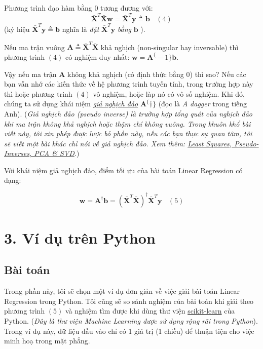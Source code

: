 Phương trình đạo hàm bằng 0 tương đương với: \begin{equation}
\mathbf{\bar{X}}^T\mathbf{\bar{X}}\mathbf{w} =
\mathbf{\bar{X}}^T\mathbf{y} \triangleq \mathbf{b}
~~~~ (4) \end{equation} (ký hiệu
$\mathbf{\bar{X}}^T\mathbf{y} \triangleq \mathbf{b}
$ nghĩa là \emph{đặt}
$\mathbf{\bar{X}}^T\mathbf{y}$
\emph{bằng} $\mathbf{b}$ ).

Nếu ma trận vuông $ \mathbf{A}
\triangleq \mathbf{\bar{X}}^T\mathbf{\bar{X}}$ khả
nghịch (non-singular hay inversable) thì phương trình
$(4)$ có nghiệm duy nhất:
$ \mathbf{w} = \mathbf{A}^\{-1\}\mathbf{b}
$.

Vậy nếu ma trận $\mathbf{A} $ không khả
nghịch (có định thức bằng 0) thì sao? Nếu các bạn vẫn nhớ các kiến thức
về hệ phương trình tuyến tính, trong trường hợp này thì hoặc phương
trinh $ (4) $ vô nghiệm, hoặc làp nó có
vô số nghiệm. Khi đó, chúng ta sử dụng khái niệm
\href{https://vi.wikipedia.org/wiki/Giả_nghịch_đảo_Moore–Penrose}{\emph{giả
nghịch đảo}} $ \mathbf{A}^\{\dagger\}
$ (đọc là \emph{A dagger} trong tiếng Anh). (\emph{Giả
nghịch đảo (pseudo inverse) là trường hợp tổng quát của nghịch đảo khi
ma trận không khả nghịch hoặc thậm chí không vuông. Trong khuôn khổ bài
viết này, tôi xin phép được lược bỏ phần này, nếu các bạn thực sự quan
tâm, tôi sẽ viết một bài khác chỉ nói về giả nghịch đảo. Xem thêm:
\href{http://www.sci.utah.edu/~gerig/CS6640-F2012/Materials/pseudoinverse-cis61009sl10.pdf}{Least
Squares, Pseudo-Inverses, PCA \& SVD}.})

Với khái niệm giả nghịch đảo, điểm tối ưu của bài toán Linear Regression
có dạng:

\begin{equation} \mathbf{w} = \mathbf{A}^{\dagger}\mathbf{b} =
(\mathbf{\bar{X}}^T\mathbf{\bar{X}})^{\dagger}
\mathbf{\bar{X}}^T\mathbf{y} ~~~~ (5)
\end{equation}

\section{3. Ví dụ trên Python}\label{vuxed-dux1ee5-truxean-python}

\subsection{Bài toán}\label{buxe0i-touxe1n}

Trong phần này, tôi sẽ chọn một ví dụ đơn giản về việc giải bài toán
Linear Regression trong Python. Tôi cũng sẽ so sánh nghiệm của bài toán
khi giải theo phương trình $(5) $ và
nghiệm tìm được khi dùng thư viện
\href{http://scikit-learn.org/stable/}{scikit-learn} của Python.
(\emph{Đây là thư viện Machine Learning được sử dụng rộng rãi trong
Python}). Trong ví dụ này, dữ liệu đầu vào chỉ có 1 giá trị (1 chiều) để
thuận tiện cho việc minh hoạ trong mặt phẳng.

